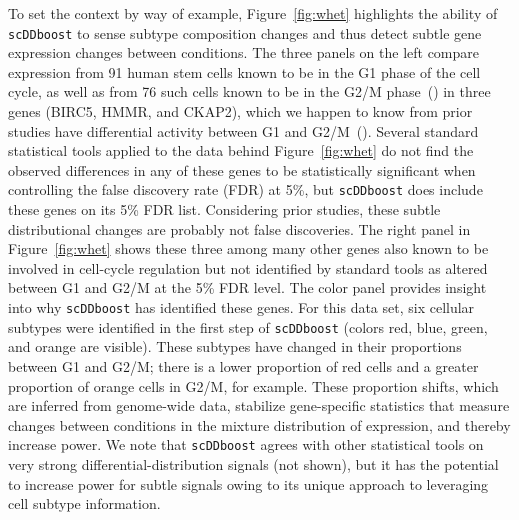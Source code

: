 \documentclass[aoas,preprint]{imsart}
\begin{document}
To set the context by way of example, 
Figure~\ref{fig:whet} highlights the ability of \verb+scDDboost+ to sense subtype composition changes 
and thus detect subtle gene expression changes between conditions.
The three panels on the left compare expression from 91 human 
stem cells known to be in the G1 phase of the cell cycle, as well as
from 76 such cells known to be in the G2/M phase~(\cite{oscope}) in three genes (BIRC5, HMMR, and CKAP2), which we happen to know from prior studies have differential activity between G1 and G2/M~(\cite{BIRC5,HMMR,RAD21}).  
Several standard statistical tools applied to the data behind Figure~\ref{fig:whet} do not find the observed
 differences in any of these genes
to be statistically significant when controlling the false discovery rate (FDR) at 5\%,
but \verb+scDDboost+ does include these genes on its 5\% FDR list.
Considering prior studies, these subtle distributional changes are probably not false discoveries. 
The right panel in Figure~\ref{fig:whet} shows these three among 
many other genes also known to be involved in cell-cycle regulation but
not identified by standard tools as altered between G1 and G2/M at the 5\% FDR level.    
The color panel provides insight into 
why \verb+scDDboost+ has identified these genes.  For this data set, six cellular subtypes 
were identified in the first step of \verb+scDDboost+ (colors red, blue, green, and orange are visible). 
These subtypes have changed in their proportions between G1 and G2/M;  there is a lower proportion 
of red cells and a greater proportion of orange cells in G2/M, for example. These proportion shifts, 
which are inferred from genome-wide data, stabilize gene-specific statistics that measure 
changes between conditions in the mixture distribution of expression, and thereby increase power.  
We note that \verb+scDDboost+ 
agrees with other statistical tools on very strong differential-distribution signals (not shown), but it 
has the potential to increase power for subtle signals owing to its unique approach to leveraging cell subtype
information.
\end{document}
